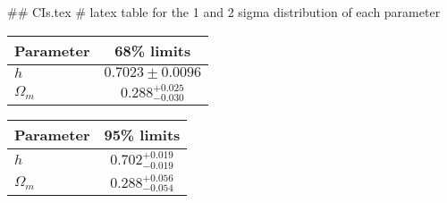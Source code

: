 ## CIs.tex
# latex table for the 1 and 2 sigma distribution of each parameter

\begin{tabular} { l  c}
 Parameter &  68\% limits\\
\hline
{\boldmath$h              $} & $0.7023\pm 0.0096          $\\
{\boldmath$\Omega_m       $} & $0.288^{+0.025}_{-0.030}   $\\
\hline
\end{tabular}

\begin{tabular} { l  c}
 Parameter &  95\% limits\\
\hline
{\boldmath$h              $} & $0.702^{+0.019}_{-0.019}   $\\
{\boldmath$\Omega_m       $} & $0.288^{+0.056}_{-0.054}   $\\
\hline
\end{tabular}
